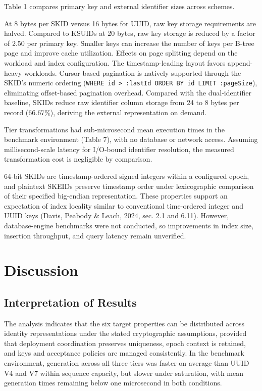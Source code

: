 \documentclass[fleqn,10pt]{wlpeerj}
\begin{document}
Table 1 compares primary key and external identifier sizes across
schemes.

At 8 bytes per SKID versus 16 bytes for UUID, raw key storage
requirements are halved. Compared to KSUIDs at 20 bytes, raw key storage
is reduced by a factor of 2.50 per primary key. Smaller keys can
increase the number of keys per B-tree page and improve cache
utilization. Effects on page splitting depend on the workload and index
configuration. The timestamp-leading layout favors append-heavy
workloads. Cursor-based pagination is natively supported through the
SKID's numeric ordering
(\texttt{WHERE\ id\ \textgreater{}\ :lastId\ ORDER\ BY\ id\ LIMIT\ :pageSize}),
eliminating offset-based pagination overhead. Compared with the
dual-identifier baseline, SKIDs reduce raw identifier column storage
from 24 to 8 bytes per record (66.67\%), deriving the external
representation on demand.

Tier transformations had sub-microsecond mean execution times in the
benchmark environment (Table 7), with no database or network access.
Assuming millisecond-scale latency for I/O-bound identifier resolution,
the measured transformation cost is negligible by comparison.

64-bit SKIDs are timestamp-ordered signed integers within a configured
epoch, and plaintext SKEIDs preserve timestamp order under lexicographic
comparison of their specified big-endian representation. These
properties support an expectation of index locality similar to
conventional time-ordered integer and UUID keys (Davis, Peabody \&
Leach, 2024, sec. 2.1 and 6.11). However, database-engine benchmarks
were not conducted, so improvements in index size, insertion throughput,
and query latency remain unverified.

\section{Discussion}\label{discussion}

\subsection{Interpretation of Results}\label{interpretation-of-results}

The analysis indicates that the six target properties can be distributed
across identity representations under the stated cryptographic
assumptions, provided that deployment coordination preserves uniqueness,
epoch context is retained, and keys and acceptance policies are managed
consistently. In the benchmark environment, generation across all three
tiers was faster on average than UUID V4 and V7 within sequence
capacity, but slower under saturation, with mean generation times
remaining below one microsecond in both conditions.
\end{document}
